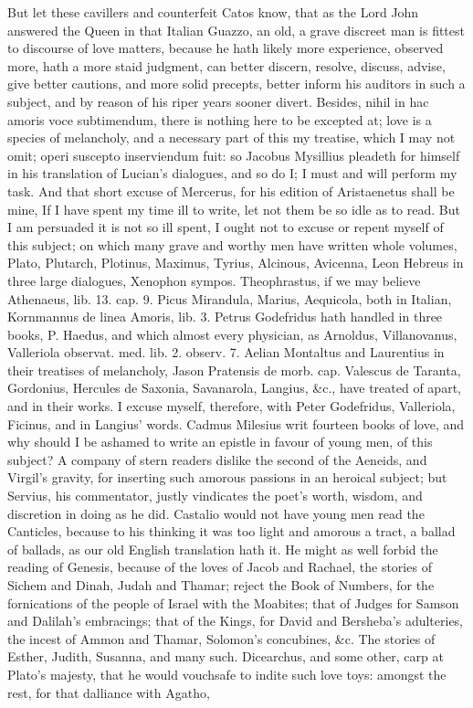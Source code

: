{But let these cavillers and counterfeit Catos know, that as the Lord
John answered the Queen in that Italian Guazzo, an old, a grave
discreet man is fittest to discourse of love matters, because he hath
likely more experience, observed more, hath a more staid judgment, can
better discern, resolve, discuss, advise, give better cautions, and
more solid precepts, better inform his auditors in such a subject, and
by reason of his riper years sooner divert. Besides, nihil in hac
amoris voce subtimendum, there is nothing here to be excepted at; love
is a species of melancholy, and a necessary part of this my treatise,
which I may not omit; operi suscepto inserviendum fuit: so Jacobus
Mysillius pleadeth for himself in his translation of Lucian's
dialogues, and so do I; I must and will perform my task. And that short
excuse of Mercerus, for his edition of Aristaenetus shall be mine,
If I have spent my time ill to write, let not them be so idle as
to read. But I am persuaded it is not so ill spent, I ought not to
excuse or repent myself of this subject; on which many grave and worthy
men have written whole volumes, Plato, Plutarch, Plotinus, Maximus,
Tyrius, Alcinous, Avicenna, Leon Hebreus in three large dialogues,
Xenophon sympos. Theophrastus, if we may believe Athenaeus, lib. 13.
cap. 9. Picus Mirandula, Marius, Aequicola, both in Italian, Kornmannus
de linea Amoris, lib. 3. Petrus Godefridus hath handled in three books,
P. Haedus, and which almost every physician, as Arnoldus, Villanovanus,
Valleriola observat. med. lib. 2. observ. 7. Aelian Montaltus and
Laurentius in their treatises of melancholy, Jason Pratensis de morb.
cap. Valescus de Taranta, Gordonius, Hercules de Saxonia, Savanarola,
Langius, \&c., have treated of apart, and in their works. I excuse
myself, therefore, with Peter Godefridus, Valleriola, Ficinus, and in
Langius' words. Cadmus Milesius writ fourteen books of love, and
why should I be ashamed to write an epistle in favour of young men, of
this subject? A company of stern readers dislike the second of the
Aeneids, and Virgil's gravity, for inserting such amorous passions in
an heroical subject; but Servius, his commentator, justly
vindicates the poet's worth, wisdom, and discretion in doing as he did.
Castalio would not have young men read the  Canticles, because to
his thinking it was too light and amorous a tract, a ballad of ballads,
as our old English translation hath it. He might as well forbid the
reading of Genesis, because of the loves of Jacob and Rachael, the
stories of Sichem and Dinah, Judah and Thamar; reject the Book of
Numbers, for the fornications of the people of Israel with the
Moabites; that of Judges for Samson and Dalilah's embracings; that of
the Kings, for David and Bersheba's adulteries, the incest of Ammon and
Thamar, Solomon's concubines, \&c. The stories of Esther, Judith,
Susanna, and many such. Dicearchus, and some other, carp at Plato's
majesty, that he would vouchsafe to indite such love toys: amongst the
rest, for that dalliance with Agatho,

}
